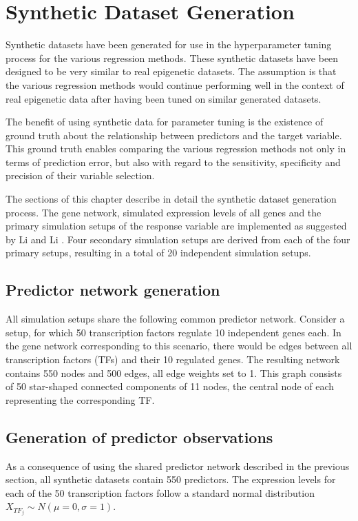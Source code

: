 \chapter{Synthetic Dataset Generation}
Synthetic datasets have been generated for use in the hyperparameter tuning process for the various regression methods. These synthetic datasets have been designed to be very similar to real epigenetic datasets. The assumption is that the various regression methods would continue performing well in the context of real epigenetic data after having been tuned on similar generated datasets.

The benefit of using synthetic data for parameter tuning is the existence of ground truth about the relationship between predictors and the target variable. This ground truth enables comparing the various regression methods not only in terms of prediction error, but also with regard to the sensitivity, specificity and precision of their variable selection.

The sections of this chapter describe in detail the synthetic dataset generation process. The gene network, simulated expression levels of all genes and the primary simulation setups of the response variable are implemented as suggested by Li and Li \cite{li2008network}. Four secondary simulation setups are derived from each of the four primary setups, resulting in a total of 20 independent simulation setups.

\section{Predictor network generation} \label{sec:pred_net}
All simulation setups share the following common predictor network. Consider a setup, for which 50 transcription factors regulate 10 independent genes each. In the gene network corresponding to this scenario, there would be edges between all transcription factors (TFs) and their 10 regulated genes. The resulting network contains 550 nodes and 500 edges, all edge weights set to 1. This graph consists of 50 star-shaped connected components of 11 nodes, the central node of each representing the corresponding TF. 

\section{Generation of predictor observations} \label{sec:obs_gen}
As a consequence of using the shared predictor network described in the previous section, all synthetic datasets contain 550 predictors. The expression levels for each of the 50 transcription factors follow a standard normal distribution $X_{TF_j} \sim N(\mu = 0, \sigma = 1)$. 

